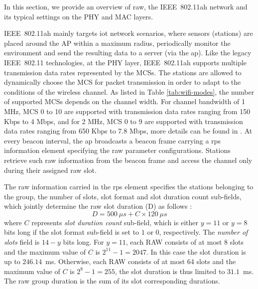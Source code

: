 In this section, we provide an overview of \gls{raw}, the IEEE~802.11ah network and its typical settings on the PHY and MAC layers. 



IEEE~802.11ah mainly targets \gls{iot} network scenarios, where sensors (stations) are placed around the AP within a maximum radius, periodically monitor the environment and send the resulting data to a server (via the \gls{ap}). Like the legacy IEEE~802.11 technologies, at the PHY layer, IEEE~802.11ah supports multiple transmission data rates represented by the MCSs. The stations are allowed to dynamically choose the MCS for packet transmission in order to adapt to the conditions of the wireless channel. As listed in Table \ref{tab:wifi-modes}, the number of supported MCSs depends on the channel width. For channel bandwidth of 1 MHz,  MCS 0 to 10 are supported with transmission data rates ranging from 150 Kbps to 4 Mbps, and for 2 MHz, MCS 0 to 9 are supported with transmission data rates ranging from 650 Kbps to 7.8 Mbps, more details can be found in \cite{80211ahStd}. At every beacon interval, the \gls{ap} broadcasts a beacon frame carrying a \gls{rps} information element specifying the \gls{raw} parameter configurations. Stations retrieve such \gls{raw} information from the beacon frame and access the channel only during their assigned \gls{raw} slot. 


The \gls{raw} information carried in the \gls{rps} element specifies the stations belonging to the group, the number of slots, slot format and slot duration count sub-fields, which jointly determine the \gls{raw} slot duration (D) as follows \cite{80211ahStd}: 
\begin{equation} \label{eq:Duration}
D = 500~\mu{}s + C \times 120~\mu{}s  
\end{equation}
where $C$ represents \textit{slot duration count} sub-field, which is either $y = 11$ or $y = 8$ bits long if the slot format sub-field is set to $1$ or $0$, respectively. The \textit{number of slots} field is $14-y$ bits long. For $y = 11$, each RAW consists of at most 8 slots and the maximum value of $C$ is $2^{11}-1=2047$. In this case the slot duration is up to $246.14$~ms. Otherwise, each RAW consists of at most 64 slots and the maximum value of $C$ is $2^{8}-1=255$, the slot duration is thus limited to $31.1$~ms. The \gls{raw} group duration is the sum of its slot corresponding durations.




